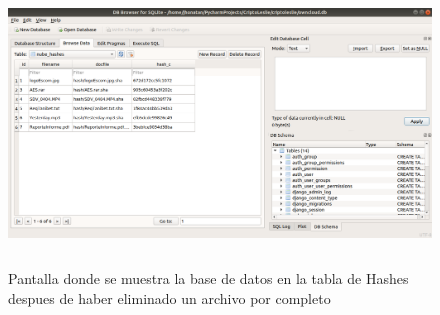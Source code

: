 			\begin{figure}[H]
			\centering
			\includegraphics[width=14cm, height=7.5cm]{./images/Implementacion/TablaHashesArchivoEliminado.png}
			\caption{Pantalla donde se muestra la base de datos en la tabla de Hashes despues de haber eliminado un archivo por completo}
			\label{fig:6-1-42} 
			\end{figure}




